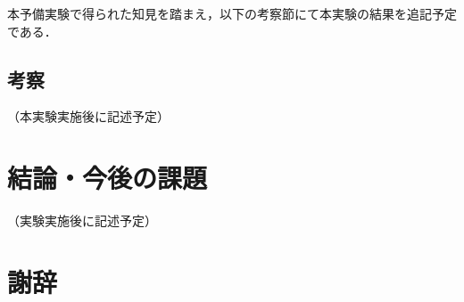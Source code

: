 \documentclass{jsarticle}
\begin{document}
本予備実験で得られた知見を踏まえ，以下の考察節にて本実験の結果を追記予定である．

\subsection{考察}

（本実験実施後に記述予定）

\newpage

\section{結論・今後の課題}\label{sec5}

（実験実施後に記述予定）

\newpage
\section*{謝辞}

\newpage



\end{document}
